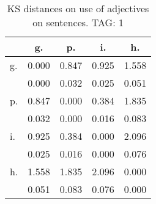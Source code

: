 \begin{table}[h!]
\begin{center}
\begin{tabular}{| l | c | c | c | c |}\hline
 & g. & p. & i. & h. \\\hline
g. & 0.000  & 0.847  & 0.925  & 1.558 \\\hline
 & 0.000  & 0.032  & 0.025  & 0.051 \\\hline
p. & 0.847  & 0.000  & 0.384  & 1.835 \\\hline
 & 0.032  & 0.000  & 0.016  & 0.083 \\\hline
i. & 0.925  & 0.384  & 0.000  & 2.096 \\\hline
 & 0.025  & 0.016  & 0.000  & 0.076 \\\hline
h. & 1.558  & 1.835  & 2.096  & 0.000 \\\hline
 & 0.051  & 0.083  & 0.076  & 0.000 \\\hline
\end{tabular}
\caption{KS distances on use of adjectives on sentences. TAG: 1}
\end{center}
\end{table}